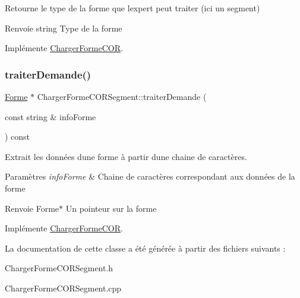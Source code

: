 Retourne le type de la forme que l\textquotesingle{}expert peut traiter (ici un segment) 

\begin{DoxyReturn}{Renvoie}
string Type de la forme 
\end{DoxyReturn}


Implémente \mbox{\hyperlink{class_charger_forme_c_o_r_ae740eabcd9b3cc3809c1fe5ffd0100a1}{Charger\+Forme\+C\+OR}}.

\mbox{\label{class_charger_forme_c_o_r_segment_ac7998f4a2669a3f88dc0b204af187780}} 
\subsubsection{\texorpdfstring{traiterDemande()}{traiterDemande()}}
{\footnotesize\ttfamily \mbox{\hyperlink{class_forme}{Forme}} $\ast$ Charger\+Forme\+C\+O\+R\+Segment\+::traiter\+Demande (\begin{DoxyParamCaption}\item[{const string \&}]{info\+Forme }\end{DoxyParamCaption}) const\hspace{0.3cm}{\ttfamily [virtual]}}



Extrait les données d\textquotesingle{}une forme à partir d\textquotesingle{}une chaine de caractères. 


\begin{DoxyParams}{Paramètres}
{\em info\+Forme} & Chaine de caractères correspondant aux données de la forme \\
\hline
\end{DoxyParams}
\begin{DoxyReturn}{Renvoie}
Forme$\ast$ Un pointeur sur la forme 
\end{DoxyReturn}


Implémente \mbox{\hyperlink{class_charger_forme_c_o_r_a1d9563c3a1ff9d6d86aa87a83bdaf8da}{Charger\+Forme\+C\+OR}}.



La documentation de cette classe a été générée à partir des fichiers suivants \+:\begin{DoxyCompactItemize}
\item 
Charger\+Forme\+C\+O\+R\+Segment.\+h\item 
Charger\+Forme\+C\+O\+R\+Segment.\+cpp\end{DoxyCompactItemize}
